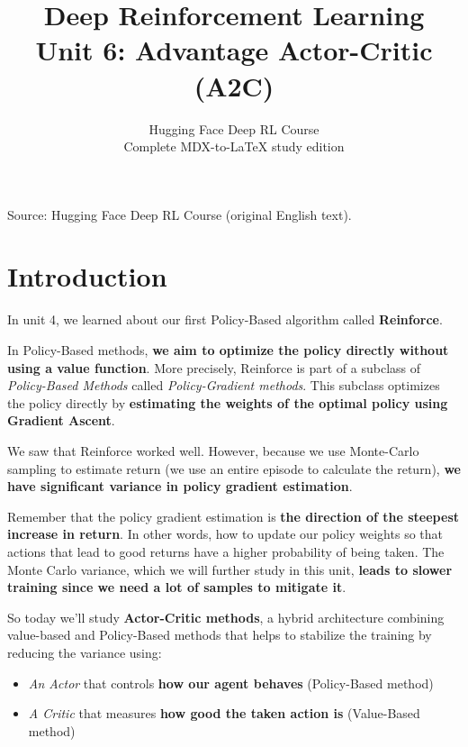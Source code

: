 \documentclass[11pt,a4paper]{article}
\title{\textbf{Deep Reinforcement Learning}\\[0.35em]\large Unit 6: Advantage Actor-Critic (A2C)}
\author{Hugging Face Deep RL Course\\\small Complete MDX-to-\LaTeX{} study edition}
\date{}
\begin{document}
\maketitle
\vspace{-0.8em}
\begin{center}\small\color{secondary}Source: Hugging Face Deep RL Course (original English text).\end{center}
\begingroup\small\setlength{\parskip}{0pt}\tableofcontents\endgroup
\vspace{0.5em}
\clearpage

\section{Introduction}\label{introduction}


In unit 4, we learned about our first Policy-Based algorithm called \textbf{Reinforce}.

In Policy-Based methods, \textbf{we aim to optimize the policy directly without using a value function}. More precisely, Reinforce is part of a subclass of \emph{Policy-Based Methods} called \emph{Policy-Gradient methods}. This subclass optimizes the policy directly by \textbf{estimating the weights of the optimal policy using Gradient Ascent}.

We saw that Reinforce worked well. However, because we use Monte-Carlo sampling to estimate return (we use an entire episode to calculate the return), \textbf{we have significant variance in policy gradient estimation}.

Remember that the policy gradient estimation is \textbf{the direction of the steepest increase in return}. In other words, how to update our policy weights so that actions that lead to good returns have a higher probability of being taken. The Monte Carlo variance, which we will further study in this unit, \textbf{leads to slower training since we need a lot of samples to mitigate it}.

So today we'll study \textbf{Actor-Critic methods}, a hybrid architecture combining value-based and Policy-Based methods that helps to stabilize the training by reducing the variance using:

\begin{itemize}
\tightlist
\item
  \emph{An Actor} that controls \textbf{how our agent behaves} (Policy-Based method)
\item
  \emph{A Critic} that measures \textbf{how good the taken action is} (Value-Based method)
\end{itemize}
\end{document}
